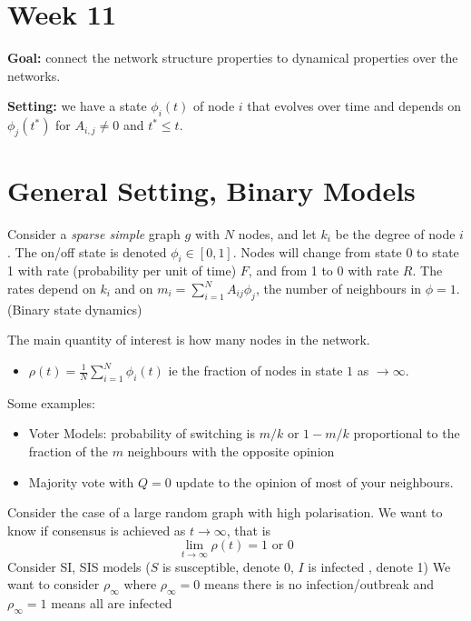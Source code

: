 \documentclass[12pt]{article}
\theoremstyle{definition}
\begin{document}
\pagebreak


\section*{Week 11}

\textbf{Goal:} connect the network structure properties to dynamical properties over the networks.

\textbf{Setting:} we have a state $\phi_i(t)$ of node $i$ that evolves over time and depends on $\phi_j(t^*)$ for $A_{i,j}\neq 0 $ and $t^* \leq t$.

\section{General Setting, Binary Models}

Consider a \textit{sparse simple} graph $g$ with $N$ nodes, and let $k_i$ be the degree of node $i$. The on/off state is denoted $\phi_i\in[0,1]$. Nodes will change from state 0 to state 1 with rate (probability per unit of time) $F$, and from 1 to 0 with rate $R$. The rates depend on $k_i$ and on $m_i=\sum_{i=1}^N A_{ij}\phi_j$, the number of neighbours in $\phi=1$.  (Binary state dynamics)

The main quantity of interest is how many nodes in the network.
\begin{itemize}
    \item $\rho(t)=\frac{1}{N} \sum_{i=1}^N \phi_i(t)$ ie the fraction of nodes in state $1$ as $\to \infty$.
\end{itemize}

Some examples:
\begin{itemize}
    \item Voter Models: probability of switching is $m/k$ or $1-m / k$ proportional to the fraction of the $m$ neighbours with the opposite opinion
    \item Majority vote with $Q=0$ update to the opinion of most of your neighbours.
\end{itemize}

Consider the case of a large random graph with high polarisation. We want to know if consensus is achieved as $t\to\infty$, that is 
\[
    \lim_{t\to \infty} \rho(t) = 1 \text{ or } 0 
\]
Consider SI, SIS models ($S$ is susceptible, denote 0, $I$ is infected , denote 1) We want to consider $\rho_\infty$ where $\rho_\infty = 0$ means there is no infection/outbreak and $\rho_\infty =1$ means all are infected
\end{document}
